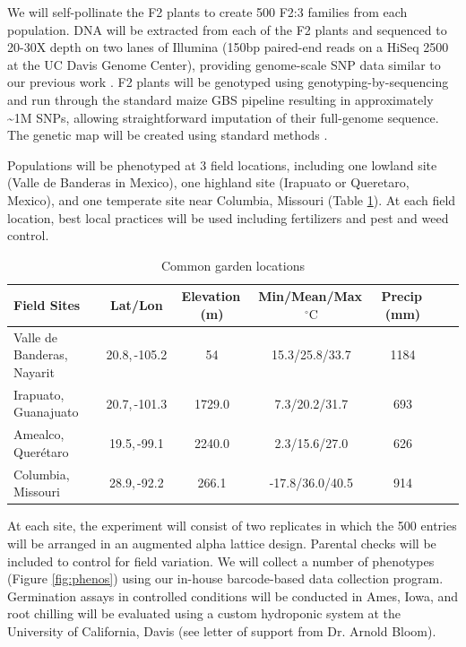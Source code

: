 We will self-pollinate the F2 plants to create 500 F2:3 families from each population.  DNA will be extracted from each of the F2 plants and sequenced to 20-30X depth on two lanes of Illumina (150bp paired-end reads on a HiSeq 2500 at the UC Davis Genome Center), providing genome-scale SNP data similar to our previous work \citep[HapMap.v2;][]{Chia2012a}.  F2 plants will be genotyped using genotyping-by-sequencing \citep[GBS;][]{Elshire2011} and run through the standard maize GBS pipeline \citep{Glaubitz2014} resulting in approximately \textasciitilde 1M SNPs, allowing straightforward imputation of their full-genome sequence.  The genetic map will be created using standard methods \citep[e.g.][]{Broman2003a}. 

Populations will be phenotyped at 3 field locations, including one lowland site (Valle de Banderas in Mexico), one highland site (Irapuato or Queretaro, Mexico), and one temperate site near Columbia, Missouri (Table \ref{tab:locales}).  At each field location, best local practices will be used including fertilizers and pest and weed control.

\begin{table}
\begin{center}
\caption{Common garden locations} \label{tab:locales}
\begin{tabular}{p{2cm}cccccc}\\\toprule  
{\bf Field Sites} & {\bf Lat/Lon } & {\bf Elevation\,(m) } &	{\bf Min/Mean/Max\,$^{\circ}\mathrm{C}$  } & {\bf Precip\,(mm) } \\ \toprule
Valle de Banderas, Nayarit	& 20.8,\,-105.2&	54		&	15.3/25.8/33.7	&	1184 \\
Irapuato, Guanajuato 	&	20.7,\,-101.3	&	1729.0	&	7.3/20.2/31.7	&	693 \\
Amealco, Quer\'etaro 	&	19.5,\,-99.1	&	2240.0 	&	2.3/15.6/27.0	&	626\\
Columbia, Missouri		& 	28.9,\,-92.2	&	266.1 	&	-17.8/36.0/40.5&	914\\ \bottomrule
\end{tabular}
\end{center}
\end{table} 

At each site, the experiment will consist of two replicates in which the 500 entries  will be arranged in an augmented alpha lattice design.  Parental checks will be included to control for field variation.  We will collect a  number of phenotypes (Figure \ref{fig:phenos}) using our in-house barcode-based data collection program. Germination assays  in controlled conditions will be conducted in Ames, Iowa, and root chilling will be evaluated using a custom hydroponic system at the University of California, Davis (see letter of support from Dr. Arnold Bloom).    

